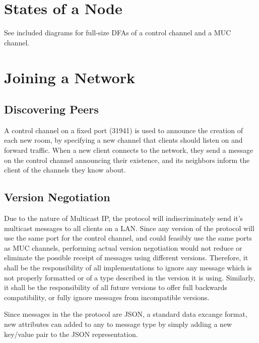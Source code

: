 \documentclass{article}
\begin{document}
\section{States of a Node}
See included diagrams for full-size DFAs of a control channel and a MUC channel.
\begin{center}
\scalebox{.38}{

}
\end{center}

\begin{center}
\scalebox{.38}{

}
\end{center}
\section{Joining a Network}

\subsection{Discovering Peers}

A control channel on a fixed port (31941) is used to announce the creation of
each new room, by specifying a new channel that clients should listen on and
forward traffic. When a new client connects to the network, they send a message
on the control channel announcing their existence, and its neighbors inform the
client of the channels they know about.

\subsection{Version Negotiation}

Due to the nature of Multicast IP, the protocol will indiscriminately send it's
multicast messages to all clients on a LAN. Since any version of the protocol
will use the same port for the control channel, and could feasibly use the same
ports as MUC channels, performing actual version negotiation would not reduce or
eliminate the possible receipt of messages using different versions. Therefore,
it shall be the responsibility of all implementations to ignore any message
which is not properly formatted or of a type described in the version it is
using. Similarly, it shall be the responsibility of all future versions to offer
full backwards compatibility, or fully ignore messages from incompatible
versions.

Since messages in the the protocol are JSON, a standard data excange format, new 
attributes can added to any to message type by simply adding a new key/value pair
to the JSON representation.
\end{document}
